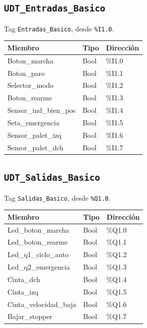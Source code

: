 \subsection*{\texttt{UDT\_Entradas\_Basico}}
Tag \texttt{Entradas\_Basico}, desde \texttt{\%I1.0}.\par\smallskip
\begin{tabular}{>{\ttfamily\small}p{5.2cm}>{\ttfamily\small}p{4.2cm}>{\ttfamily\small}p{2.4cm}}
\toprule
\textnormal{\textbf{Miembro}} & \textnormal{\textbf{Tipo}} & \textnormal{\textbf{Dirección}} \\
\midrule
Boton\_marcha & Bool & \%I1.0 \\
Boton\_paro & Bool & \%I1.1 \\
Selector\_modo & Bool & \%I1.2 \\
Boton\_rearme & Bool & \%I1.3 \\
Sensor\_ind\_bien\_pos & Bool & \%I1.4 \\
Seta\_emergencia & Bool & \%I1.5 \\
Sensor\_palet\_izq & Bool & \%I1.6 \\
Sensor\_palet\_dch & Bool & \%I1.7 \\
\bottomrule
\end{tabular}

\medskip
\subsection*{\texttt{UDT\_Salidas\_Basico}}
Tag \texttt{Salidas\_Basico}, desde \texttt{\%Q1.0}.\par\smallskip
\begin{tabular}{>{\ttfamily\small}p{5.2cm}>{\ttfamily\small}p{4.2cm}>{\ttfamily\small}p{2.4cm}}
\toprule
\textnormal{\textbf{Miembro}} & \textnormal{\textbf{Tipo}} & \textnormal{\textbf{Dirección}} \\
\midrule
Led\_boton\_marcha & Bool & \%Q1.0 \\
Led\_boton\_rearme & Bool & \%Q1.1 \\
Led\_q1\_ciclo\_auto & Bool & \%Q1.2 \\
Led\_q2\_emergencia & Bool & \%Q1.3 \\
Cinta\_dch & Bool & \%Q1.4 \\
Cinta\_izq & Bool & \%Q1.5 \\
Cinta\_velocidad\_baja & Bool & \%Q1.6 \\
Bajar\_stopper & Bool & \%Q1.7 \\
\bottomrule
\end{tabular}


